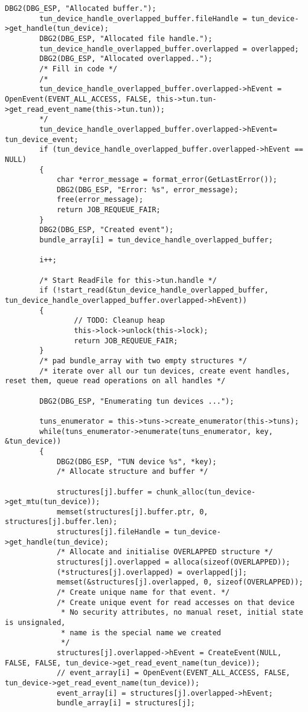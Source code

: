 \begin{lstlisting}[caption=Code für handle\_plain auf Windows,label=lst:handle-plain-windows]
        DBG2(DBG_ESP, "Allocated buffer.");
        tun_device_handle_overlapped_buffer.fileHandle = tun_device->get_handle(tun_device);
        DBG2(DBG_ESP, "Allocated file handle.");
        tun_device_handle_overlapped_buffer.overlapped = overlapped;
        DBG2(DBG_ESP, "Allocated overlapped..");
        /* Fill in code */
        /*
        tun_device_handle_overlapped_buffer.overlapped->hEvent = OpenEvent(EVENT_ALL_ACCESS, FALSE, this->tun.tun->get_read_event_name(this->tun.tun));
        */
        tun_device_handle_overlapped_buffer.overlapped->hEvent= tun_device_event;
        if (tun_device_handle_overlapped_buffer.overlapped->hEvent == NULL)
        {
            char *error_message = format_error(GetLastError());
            DBG2(DBG_ESP, "Error: %s", error_message);
            free(error_message);
            return JOB_REQUEUE_FAIR;
        }
        DBG2(DBG_ESP, "Created event");
        bundle_array[i] = tun_device_handle_overlapped_buffer;

        i++;

        /* Start ReadFile for this->tun.handle */
        if (!start_read(&tun_device_handle_overlapped_buffer, tun_device_handle_overlapped_buffer.overlapped->hEvent))
        {
                // TODO: Cleanup heap
                this->lock->unlock(this->lock);
                return JOB_REQUEUE_FAIR;
        }
        /* pad bundle_array with two empty structures */
        /* iterate over all our tun devices, create event handles, reset them, queue read operations on all handles */

        DBG2(DBG_ESP, "Enumerating tun devices ...");

        tuns_enumerator = this->tuns->create_enumerator(this->tuns);
        while(tuns_enumerator->enumerate(tuns_enumerator, key, &tun_device))
        {
            DBG2(DBG_ESP, "TUN device %s", *key);
            /* Allocate structure and buffer */

            structures[j].buffer = chunk_alloc(tun_device->get_mtu(tun_device));
            memset(structures[j].buffer.ptr, 0, structures[j].buffer.len);
            structures[j].fileHandle = tun_device->get_handle(tun_device);
            /* Allocate and initialise OVERLAPPED structure */
            structures[j].overlapped = alloca(sizeof(OVERLAPPED));
            (*structures[j].overlapped) = overlapped[j];
            memset(&structures[j].overlapped, 0, sizeof(OVERLAPPED));
            /* Create unique name for that event. */
            /* Create unique event for read accesses on that device
             * No security attributes, no manual reset, initial state is unsignaled,
             * name is the special name we created
             */
            structures[j].overlapped->hEvent = CreateEvent(NULL, FALSE, FALSE, tun_device->get_read_event_name(tun_device));
            // event_array[i] = OpenEvent(EVENT_ALL_ACCESS, FALSE, tun_device->get_read_event_name(tun_device));
            event_array[i] = structures[j].overlapped->hEvent;
            bundle_array[i] = structures[j];


\end{lstlisting}
